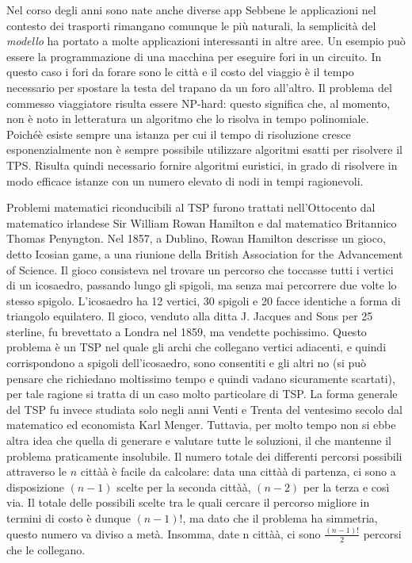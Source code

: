 \documentclass[11pt]{article}
\begin{document}
Nel corso degli anni sono nate anche diverse app
Sebbene le applicazioni nel contesto dei trasporti rimangano comunque le più naturali, la semplicità del \textit{modello} ha portato a molte applicazioni interessanti in altre aree. Un esempio può essere la programmazione di una macchina per eseguire fori in un circuito. In questo caso i fori da forare sono le città e il costo del viaggio è il tempo necessario per spostare la testa del trapano da un foro all'altro. 
Il problema del commesso viaggiatore risulta essere NP-hard: questo significa che, al momento, non è noto in letteratura un algoritmo che lo risolva in tempo polinomiale. Poiché\`e esiste sempre una istanza per cui il tempo di risoluzione cresce esponenzialmente non è sempre possibile utilizzare algoritmi esatti per risolvere il TPS. Risulta quindi necessario fornire algoritmi euristici, in grado di risolvere in modo efficace istanze con un numero elevato di nodi in tempi ragionevoli.


Problemi matematici riconducibili al TSP furono trattati nell'Ottocento dal matematico irlandese Sir William Rowan Hamilton e dal matematico Britannico Thomas Penyngton.  Nel 1857, a Dublino, Rowan Hamilton descrisse un gioco, detto Icosian game, a una riunione della British Association for the Advancement of Science. Il gioco consisteva nel trovare un percorso che toccasse tutti i vertici di un icosaedro, passando lungo gli spigoli, ma senza mai percorrere due volte lo stesso spigolo. L'icosaedro ha 12 vertici, 30 spigoli e 20 facce identiche a forma di triangolo equilatero.
Il gioco, venduto alla ditta J. Jacques and Sons per 25 sterline, fu brevettato a Londra nel 1859, ma vendette pochissimo. Questo problema \`e un TSP nel quale gli archi che collegano vertici adiacenti, e quindi corrispondono a spigoli dell'icosaedro, sono consentiti e gli altri no (si può pensare che richiedano moltissimo tempo e quindi vadano sicuramente scartati), per tale ragione si tratta di un caso molto particolare di TSP. La forma generale del TSP fu invece studiata solo negli anni Venti e Trenta del ventesimo secolo dal matematico ed economista Karl Menger. Tuttavia, per molto tempo non si ebbe altra idea che quella di generare e valutare tutte le soluzioni, il che mantenne il problema praticamente insolubile. Il numero totale dei differenti percorsi possibili attraverso le $n$ città\`a \`e facile da calcolare: data una città\`a di partenza, ci sono a disposizione $(n - 1)$ scelte per la seconda città\`a, $(n - 2)$ per la terza e così via. Il totale delle possibili scelte tra le quali cercare il percorso migliore in termini di costo \`e dunque $(n - 1)!$, ma dato che il problema ha simmetria, questo numero va diviso a metà. Insomma, date n città\`a, ci sono $\frac{(n-1)!}{2}$ percorsi che le collegano.
\end{document}
